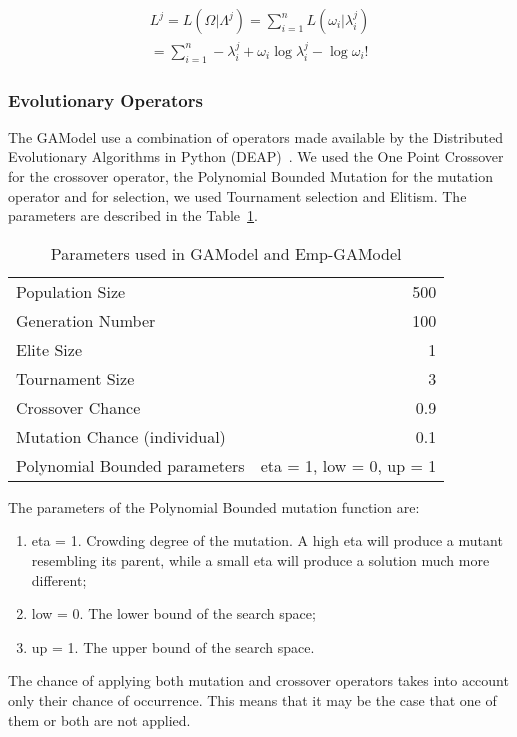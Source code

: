 \begin{equation}\label{log-like}
\begin{split}
L^j = L(\Omega|\Lambda^j) = \sum_{i=1}^{n}L(\omega_i|\lambda_i^j)  \\
= \sum_{i=1}^{n} -\lambda_i^j + \omega_i\log\lambda_i^j - \log\omega_i!  
\end{split}
\end{equation}


\subsubsection{Evolutionary Operators}\label{gaOperators}
The GAModel use a combination of operators made available by the Distributed Evolutionary Algorithms in Python (DEAP)~\cite{DeRainville}. We used the One Point Crossover for the crossover operator, the Polynomial Bounded Mutation for the mutation operator and for selection, we used Tournament selection and Elitism. The parameters are described in the Table~\ref{GAParameters5.1}.

\begin{table}[H]
	\caption{Parameters used in GAModel and Emp-GAModel}
	\label{GAParameters5.1}
	\begin{center}
		\begin{tabular}{|l|r|}
			\hline
			Population Size & 500\\
			Generation Number & 100\\
			Elite Size & 1\\
			Tournament Size & 3\\
			Crossover Chance & 0.9\\
			Mutation Chance (individual) & 0.1\\
			Polynomial Bounded parameters & eta = 1, low = 0, up = 1\\
			\hline    
		\end{tabular}
	\end{center}
\end{table}

The parameters of the Polynomial Bounded mutation function are: 
\begin{enumerate}
	\item eta = 1. Crowding degree of the mutation. A high eta will produce a mutant resembling its parent, while a small eta will produce a solution much more different;
	\item low = 0. The lower bound of the search space;
	\item up = 1. The upper bound of the search space.
\end{enumerate}

The chance of applying both mutation and crossover operators takes into account only their chance of occurrence. This means that it may be the case that one of them or both are not applied.

